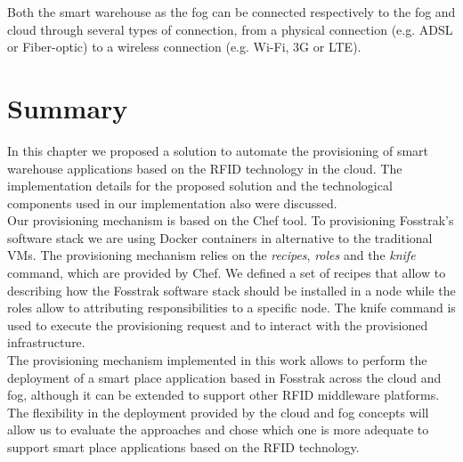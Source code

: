 Both the smart warehouse as the fog can be connected respectively to the fog and cloud through several
types of connection, from a physical connection (e.g. \gls{ADSL} or Fiber-optic) to a wireless connection
(e.g. Wi-Fi, 3G or \gls{LTE}).

\section{Summary}
\label{sec:sol_summary}
In this chapter we proposed a solution to automate the provisioning of smart warehouse applications
based on the \gls{RFID} technology in the cloud. The implementation details for the proposed
solution and the technological components used in our implementation also were discussed.\\

Our provisioning mechanism is based on the Chef tool. To provisioning Fosstrak's software stack we are
using Docker containers in alternative to the traditional \glspl{VM}. The provisioning mechanism relies
on the \textit{recipes}, \textit{roles} and the \textit{knife} command, which are provided by Chef.
We defined a set of recipes that allow to describing how the Fosstrak software stack should be installed
in a node while the roles allow to attributing responsibilities to a specific node. The knife command
is used to execute the provisioning request and to interact with the provisioned infrastructure.\\

The provisioning mechanism implemented in this work allows to perform the deployment of a smart place
application based in Fosstrak across the cloud and fog, although it can be extended to support other
\gls{RFID} middleware platforms. The flexibility in the deployment provided by the cloud and fog
concepts will allow us to evaluate the approaches and chose which one is more adequate to support smart
place applications based on the \gls{RFID} technology.
